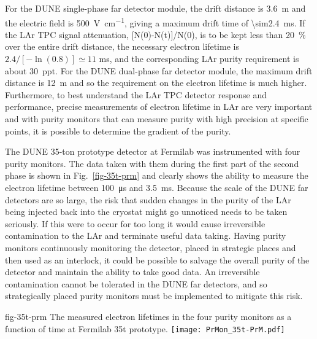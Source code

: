 For the DUNE single-phase far detector module, the drift distance is \SI{3.6}{\meter} and the electric field is \SI{500}{\volt\per\centi\meter}, giving a maximum drift time of \SI{\sim2.4}{\milli\second}. If the LAr TPC signal attenuation, [N(0)-N(t)]/N(0), is to be kept less than \SI{20}{\percent} over the entire drift distance, the necessary electron lifetime is $2.4/[-\ln(0.8)] \simeq 11 $ ms, and the corresponding LAr purity requirement is about \SI{30}{ppt}. For the DUNE dual-phase far detector module, the maximum drift distance is \SI{12}{\meter} and so the requirement on the electron lifetime is much higher. Furthermore, to best understand the LAr TPC detector response and performance, precise measurements of electron lifetime in LAr are very important and with purity monitors that can measure purity with high precision at specific points, it is possible to determine the gradient of the purity.

The DUNE 35-ton prototype detector at Fermilab was instrumented with four purity monitors. The data taken with them during the first part of the second phase is shown in Fig.~\ref{fig-35t-prm} and clearly shows the ability to measure the electron lifetime between \SI{100}{\micro\second} and \SI{3.5}{\milli\second}.  Because the scale of the DUNE far detectors are so large, the risk that sudden changes in the purity of the LAr being injected back into the cryostat might go unnoticed needs to be taken seriously.  If this were to occur for too long it would cause irreversible contamination to the LAr and terminate useful data taking.  Having purity monitors continuously monitoring the detector, placed in strategic places and then used as an interlock, it could be possible to salvage the overall purity of the detector and maintain the ability to take good data. An irreversible contamination cannot be tolerated in the DUNE far detectors, and so strategically placed purity monitors must be implemented to mitigate this risk. 

\begin{dunefigure}{fig-35t-prm}
  {The measured electron lifetimes in the four purity monitors as a function of time at Fermilab 35\si{t} prototype.}
  \texttt{[image: PrMon\_35t-PrM.pdf]}%
\end{dunefigure}


